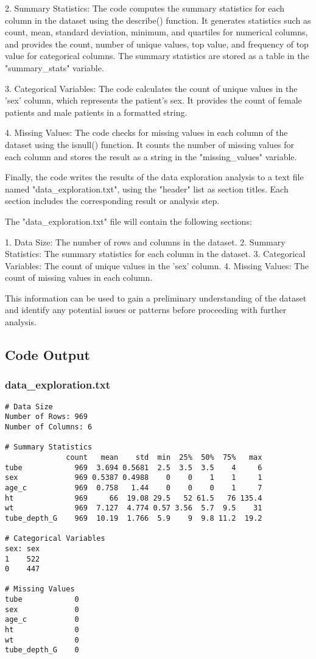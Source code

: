 \documentclass[11pt]{article}
\begin{document}
2. Summary Statistics: The code computes the summary statistics for each column in the dataset using the describe() function. It generates statistics such as count, mean, standard deviation, minimum, and quartiles for numerical columns, and provides the count, number of unique values, top value, and frequency of top value for categorical columns. The summary statistics are stored as a table in the "summary\_stats" variable.

3. Categorical Variables: The code calculates the count of unique values in the 'sex' column, which represents the patient's sex. It provides the count of female patients and male patients in a formatted string.

4. Missing Values: The code checks for missing values in each column of the dataset using the isnull() function. It counts the number of missing values for each column and stores the result as a string in the "missing\_values" variable.

Finally, the code writes the results of the data exploration analysis to a text file named "data\_exploration.txt", using the "header" list as section titles. Each section includes the corresponding result or analysis step. 

The "data\_exploration.txt" file will contain the following sections:

1. Data Size: The number of rows and columns in the dataset.
2. Summary Statistics: The summary statistics for each column in the dataset.
3. Categorical Variables: The count of unique values in the 'sex' column.
4. Missing Values: The count of missing values in each column.

This information can be used to gain a preliminary understanding of the dataset and identify any potential issues or patterns before proceeding with further analysis.

\subsection{Code Output}

\subsubsection*{data\_exploration.txt}

\begin{Verbatim}[tabsize=4]
# Data Size
Number of Rows: 969
Number of Columns: 6

# Summary Statistics
              count   mean    std  min  25%  50%  75%   max
tube            969  3.694 0.5681  2.5  3.5  3.5    4     6
sex             969 0.5387 0.4988    0    0    1    1     1
age_c           969  0.758   1.44    0    0    0    1     7
ht              969     66  19.08 29.5   52 61.5   76 135.4
wt              969  7.127  4.774 0.57 3.56  5.7  9.5    31
tube_depth_G    969  10.19  1.766  5.9    9  9.8 11.2  19.2

# Categorical Variables
sex: sex
1    522
0    447

# Missing Values
tube            0
sex             0
age_c           0
ht              0
wt              0
tube_depth_G    0


\end{Verbatim}
\end{document}
